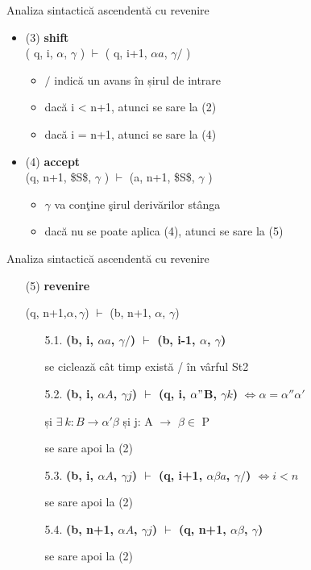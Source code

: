 \documentclass[pdf]{beamer}
\begin{document}
\begin{frame}{Analiza sintactică ascendentă cu revenire}
\begin{itemize}
\item{(3)}
\textbf{shift}\\
( q, i, $\alpha$, $\gamma$ ) $\vdash$ ( q, i+1, $\alpha a$, $\gamma /$ )
\begin{itemize}
\item 
$/$ indică un avans în șirul de intrare
\item
dacă i < n+1, atunci se sare la (2)
\item 
dacă i = n+1, atunci se sare la (4)
\end{itemize}

\item{(4)}
\textbf{accept}\\
 (q, n+1, \$S\$, $\gamma$ ) $\vdash$  (a, n+1, \$S\$, $\gamma$ )
\begin{itemize}
\item
$\gamma$  va conţine şirul derivărilor stânga
\item
dacă nu se poate aplica (4), atunci se sare la (5)
\end{itemize}
\end{itemize}
\end{frame}



\begin{frame}{Analiza sintactică ascendentă cu revenire}
\begin{enumerate}
\item[(5)]\textbf{revenire}

(q, n+1,$\alpha,\gamma$) $\vdash$ (b, n+1, $\alpha$, $\gamma$)

\begin{enumerate}
\item[5.1.]\textbf{(b, i, $\alpha a$, $\gamma /$) $\vdash$ (b, i-1, $\alpha$, $\gamma$) }

se ciclează cât timp există / în vârful St2

\item[5.2.]\textbf{(b, i, $\alpha A$, $\gamma j$) $\vdash$ (q, i, $\alpha"$B, $\gamma k$)} $\Leftrightarrow \alpha=\alpha''\alpha'$

și $\exists \ k: B \rightarrow \alpha '\beta$ și j: A $\rightarrow$ $\beta \in$ P

se sare apoi la (2)

\item[5.3.]\textbf{(b, i, $\alpha A$, $\gamma j$) $\vdash$ (q, i+1, $\alpha \beta a$, $\gamma /$) $\Leftrightarrow i<n$}

se sare apoi la (2)

\item[5.4.]\textbf{(b, n+1, $\alpha A$, $\gamma j$) $\vdash$ (q, n+1, $\alpha \beta$, $\gamma$)}

se sare apoi la (2)

\end{enumerate}
\end{enumerate}
\end{frame}
\end{document}
